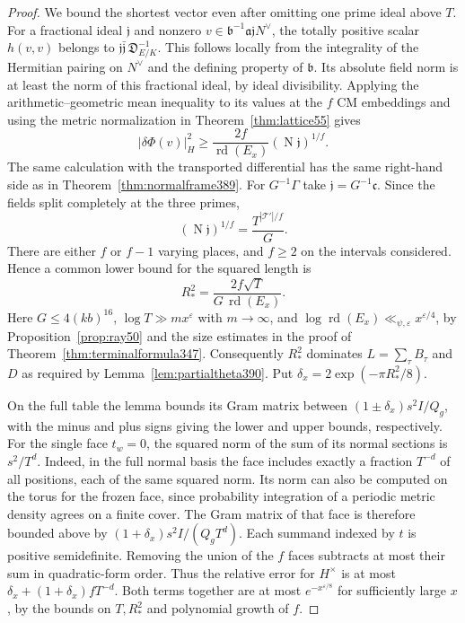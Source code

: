 \documentclass[a4paper,11pt]{article}
\theoremstyle{definition}
\theoremstyle{remark}
\numberwithin{equation}{section}
\begin{document}
\begin{proof}
We bound the shortest vector even after omitting one prime
ideal above \(T\). For a fractional ideal \(\mathfrak j\) and
nonzero \(v\in\mathfrak b^{-1}\mathfrak a\mathfrak j N^\vee\),
the totally positive scalar \(h(v,v)\) belongs to
\(\mathfrak j\bar{\mathfrak j}\,\mathfrak D_{E/K}^{-1}\).
This follows locally from the integrality of the Hermitian
pairing on \(N^\vee\) and the defining property of
\(\mathfrak b\). Its absolute field norm is at least the norm
of this fractional ideal, by ideal divisibility. Applying the
arithmetic--geometric mean inequality to its values at the
\(f\) CM embeddings and using the metric normalization in
Theorem~\ref{thm:lattice55} gives
\[
   |\delta\Phi(v)|_H^2
        \ge \frac{2f}{\operatorname{rd}(E_x)}
                         (\operatorname N\mathfrak j)^{1/f}.
\]
The same calculation with the transported differential has
the same right-hand side as in Theorem~\ref{thm:normalframe389}.
For \(G^{-1}\Gamma\) take \(\mathfrak j=G^{-1}\mathfrak c\).
Since the fields split completely at the three primes,
\[
  (\operatorname N\mathfrak j)^{1/f}
            =\frac{T^{|\mathcal T'|/f}}{G}.
\]
There are either \(f\) or \(f-1\) varying places, and \(f\ge2\)
on the intervals considered. Hence a common lower bound for
the squared length is
\[
          R_*^2=\frac{2f\sqrt T}{G\,\operatorname{rd}(E_x)} .
\]
Here \(G\le4(kb)^{16}\), \(\log T\gg m x^\varepsilon\) with
\(m\to\infty\), and \(\log\operatorname{rd}(E_x)
       \ll_{\psi,\varepsilon}x^{\varepsilon/4}\), by
Proposition~\ref{prop:ray50} and the size estimates in the
proof of Theorem~\ref{thm:terminalformula347}. Consequently
\(R_*^2\) dominates \(L=\sum_\tau B_\tau\) and \(D\) as
required by Lemma~\ref{lem:partialtheta390}.
Put \(\delta_x=2\exp(-\pi R_*^2/8)\).

On the full table the lemma bounds its Gram matrix between
\((1\pm\delta_x)s^2 I/Q_g\), with the minus and plus signs
giving the lower and upper bounds, respectively. For the
single face \(t_w=0\), the squared norm of the sum of its
normal sections is \(s^2/T^d\). Indeed, in the full normal
basis the face includes exactly a fraction \(T^{-d}\) of all
positions, each of the same squared norm. Its norm can also be
computed on the torus for the frozen face, since probability
integration of a periodic metric density agrees on a finite
cover. The Gram matrix of that face is therefore bounded above
by \((1+\delta_x)s^2 I/(Q_gT^d)\). Each summand indexed by
\(t\) is positive semidefinite. Removing the union of the \(f\)
faces subtracts at most their sum in quadratic-form order.
Thus the relative error for \(H^\times\) is at most
\(\delta_x+(1+\delta_x)fT^{-d}\). Both terms together are at
most \(e^{-x^{\varepsilon/8}}\) for sufficiently large \(x\),
by the bounds on \(T,R_*^2\) and polynomial growth of \(f\).
\end{proof}
\end{document}
